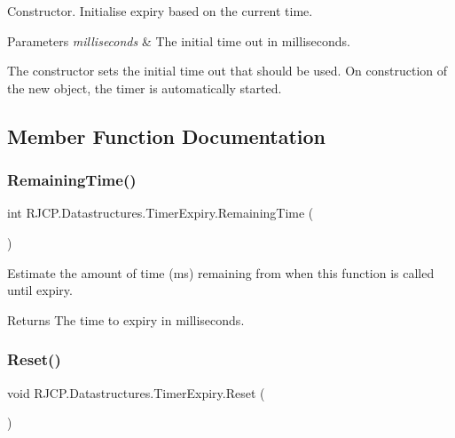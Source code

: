 Constructor. Initialise expiry based on the current time. 


\begin{DoxyParams}{Parameters}
{\em milliseconds} & The initial time out in milliseconds.\\
\hline
\end{DoxyParams}


The constructor sets the initial time out that should be used. On construction of the new object, the timer is automatically started. 

\subsection{Member Function Documentation}
\mbox{\label{class_r_j_c_p_1_1_datastructures_1_1_timer_expiry_aae9e5e2c9c3f6d30001e4fb04abf2244}} 
\subsubsection{\texorpdfstring{RemainingTime()}{RemainingTime()}}
{\footnotesize\ttfamily int R\+J\+C\+P.\+Datastructures.\+Timer\+Expiry.\+Remaining\+Time (\begin{DoxyParamCaption}{ }\end{DoxyParamCaption})}



Estimate the amount of time (ms) remaining from when this function is called until expiry. 

\begin{DoxyReturn}{Returns}
The time to expiry in milliseconds.
\end{DoxyReturn}
\mbox{\label{class_r_j_c_p_1_1_datastructures_1_1_timer_expiry_ad2241fbbdbbe1423b50f4b4b54ccbed1}} 
\subsubsection{\texorpdfstring{Reset()}{Reset()}}
{\footnotesize\ttfamily void R\+J\+C\+P.\+Datastructures.\+Timer\+Expiry.\+Reset (\begin{DoxyParamCaption}{ }\end{DoxyParamCaption})}



